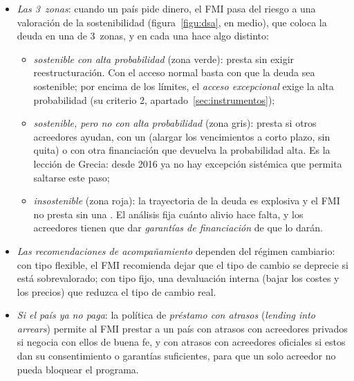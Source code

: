 \documentclass[11pt]{article}
\begin{document}
\begin{itemize}
\item \emph{Las 3~zonas}: cuando un país pide dinero, el FMI pasa del riesgo a una valoración de la sostenibilidad (figura~\ref{figu:dsa}, en medio), que coloca la deuda en una de 3~zonas, y en cada una hace algo distinto:
  \begin{itemize}
  \item \emph{sostenible con alta probabilidad} (zona verde): presta sin exigir reestructuración. Con el acceso normal basta con que la deuda sea sostenible; por encima de los límites, el \emph{acceso excepcional} exige la alta probabilidad (su criterio 2, apartado~\ref{sec:instrumentos});
  \item \emph{sostenible, pero no con alta probabilidad} (zona gris): presta si otros acreedores ayudan, con un  (alargar los vencimientos a corto plazo, sin quita) o con otra financiación que devuelva la probabilidad alta. Es la lección de Grecia: desde 2016 ya no hay excepción sistémica que permita saltarse este paso;
  \item \emph{insostenible} (zona roja): la trayectoria de la deuda es explosiva y el FMI no presta sin una . El análisis fija cuánto alivio hace falta, y los acreedores tienen que dar \emph{garantías de financiación} de que lo darán.
  \end{itemize}
\item \emph{Las recomendaciones de acompañamiento} dependen del régimen cambiario: con tipo flexible, el FMI recomienda dejar que el tipo de cambio se deprecie si está sobrevalorado; con tipo fijo, una devaluación interna (bajar los costes y los precios) que reduzca el tipo de cambio real.
\item \emph{Si el país ya no paga}: la política de \emph{préstamo con atrasos} (\emph{lending into arrears}) permite al FMI prestar a un país con atrasos con acreedores privados si negocia con ellos de buena fe, y con atrasos con acreedores oficiales si estos dan su consentimiento o garantías suficientes, para que un solo acreedor no pueda bloquear el programa.
\end{itemize}

\begin{infografia}[tbp]
\centering
\caption{Del análisis de sostenibilidad de la deuda a la decisión de prestar y a la reestructuración}\label{figu:dsa}
\end{infografia}
\end{document}
